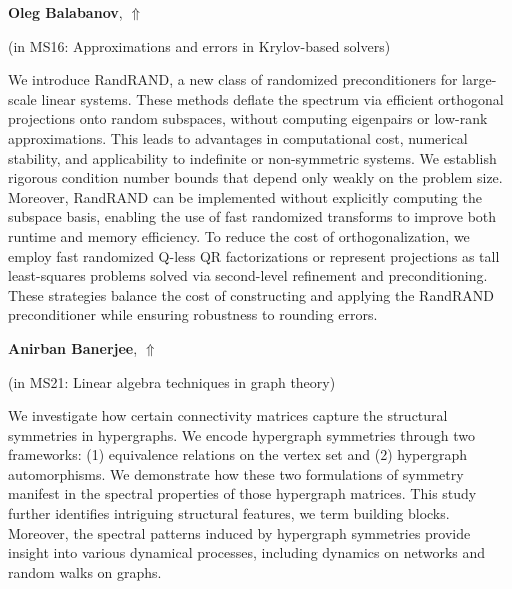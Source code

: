 \documentclass[ILAS2025-program.tex]{subfiles}
\begin{document}
\hypertarget{down0344}{}\begin{ilasabstract}
    
\textbf{Oleg Balabanov},  \hfill \hyperlink{up0344}{$\Uparrow$}
    
    
(in {\color{mstitle}MS16: Approximations and errors in Krylov-based solvers})
        
\mtskip
    We introduce RandRAND, a new class of randomized preconditioners for large-scale linear systems. These methods deflate the spectrum via efficient orthogonal projections onto random subspaces, without computing eigenpairs or low-rank approximations. This leads to advantages in computational cost, numerical stability, and applicability to indefinite or non-symmetric systems. We establish rigorous condition number bounds that depend only weakly on the problem size. Moreover, RandRAND can be implemented without explicitly computing the subspace basis, enabling the use of fast randomized transforms to improve both runtime and memory efficiency. To reduce the cost of orthogonalization, we employ fast randomized Q-less QR factorizations or represent projections as tall least-squares problems solved via second-level refinement and preconditioning. These strategies balance the cost of constructing and applying the RandRAND preconditioner while ensuring robustness to rounding errors.
\end{ilasabstract}
    

\hypertarget{down0382}{}\begin{ilasabstract}
    
\textbf{Anirban Banerjee},  \hfill \hyperlink{up0382}{$\Uparrow$}
    
    
(in {\color{mstitle}MS21: Linear algebra techniques in graph theory})
        
\mtskip
    We investigate how certain connectivity matrices capture the structural symmetries in hypergraphs. We encode hypergraph symmetries through two frameworks: (1) equivalence relations on the vertex set and (2) hypergraph automorphisms. We demonstrate how these two formulations of symmetry manifest in the spectral properties of those hypergraph matrices. This study further identifies intriguing structural features, we term building blocks. Moreover, the spectral patterns induced by hypergraph symmetries provide insight into various dynamical processes, including dynamics on networks and random walks on graphs.

\end{ilasabstract}
    
\end{document}
